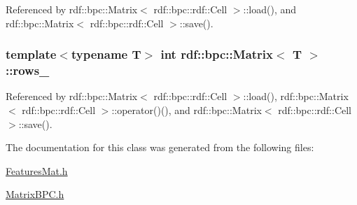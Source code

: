 Referenced by rdf\+::bpc\+::\+Matrix$<$ rdf\+::bpc\+::rdf\+::\+Cell $>$\+::load(), and rdf\+::bpc\+::\+Matrix$<$ rdf\+::bpc\+::rdf\+::\+Cell $>$\+::save().

\subsubsection[{\texorpdfstring{rows\+\_\+}{rows_}}]{\setlength{\rightskip}{0pt plus 5cm}template$<$typename T$>$ int {\bf rdf\+::bpc\+::\+Matrix}$<$ T $>$\+::rows\+\_\+\hspace{0.3cm}{\ttfamily [private]}}\hypertarget{classrdf_1_1bpc_1_1Matrix_a594473393d0fb508cf68714062f65256}{}\label{classrdf_1_1bpc_1_1Matrix_a594473393d0fb508cf68714062f65256}


Referenced by rdf\+::bpc\+::\+Matrix$<$ rdf\+::bpc\+::rdf\+::\+Cell $>$\+::load(), rdf\+::bpc\+::\+Matrix$<$ rdf\+::bpc\+::rdf\+::\+Cell $>$\+::operator()(), and rdf\+::bpc\+::\+Matrix$<$ rdf\+::bpc\+::rdf\+::\+Cell $>$\+::save().



The documentation for this class was generated from the following files\+:\begin{DoxyCompactItemize}
\item 
\hyperlink{FeaturesMat_8h}{Features\+Mat.\+h}\item 
\hyperlink{MatrixBPC_8h}{Matrix\+B\+P\+C.\+h}\end{DoxyCompactItemize}

